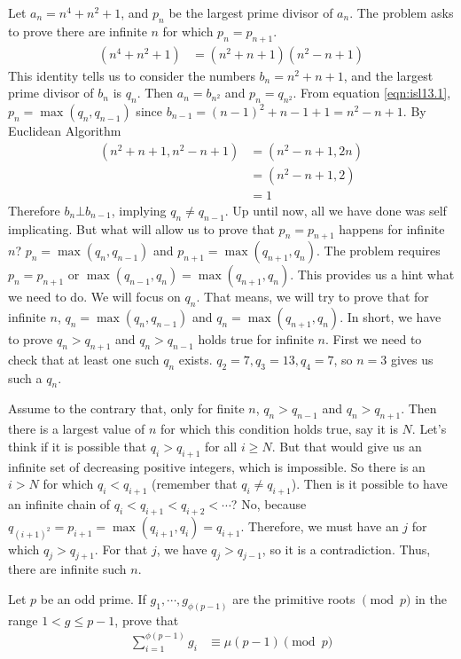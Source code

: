 \documentclass[problems.tex]{subfile}
\begin{document}
	\begin{solution}
		Let $a_n=n^4+n^2+1$, and $p_n$ be the largest prime divisor of $a_n$. The problem asks to prove there are infinite $n$ for which $p_n=p_{n+1}$.
			\begin{align}
				(n^4+n^2+1) & = (n^2+n+1)(n^2-n+1)\label{eqn:isl13.1}
			\end{align}
		This identity tells us to consider the numbers $b_n=n^2+n+1$, and the largest prime divisor of $b_n$ is $q_n$. Then $a_n=b_{n^2}$ and $p_n=q_{n^2}$. From equation \eqref{eqn:isl13.1}, $p_n=\max(q_n,q_{n-1})$ since $b_{n-1}=(n-1)^2+n-1+1=n^2-n+1$. By Euclidean Algorithm
			\begin{align*}
				(n^2+n+1,n^2-n+1) & = (n^2-n+1,2n)\\
								  & = (n^2-n+1,2)\\
								  & = 1
			\end{align*}
		Therefore $b_n\bot b_{n-1}$, implying $q_n\neq q_{n-1}$. Up until now, all we have done was self implicating. But what will allow us to prove that $p_n=p_{n+1}$ happens for infinite $n$? $p_n=\max(q_n,q_{n-1})$ and $p_{n+1}=\max(q_{n+1},q_n)$. The problem requires $p_n=p_{n+1}$ or $\max(q_{n-1},q_n)=\max(q_{n+1},q_n)$. This provides us a hint what we need to do. We will focus on $q_n$. That means, we will try to prove that for infinite $n$, $q_n=\max(q_n,q_{n-1})$ and $q_n=\max(q_{n+1},q_n)$. In short, we have to prove $q_n>q_{n+1}$ and $q_n>q_{n-1}$ holds true for infinite $n$. First we need to check that at least one such $q_n$ exists. $q_2=7,q_3=13,q_4=7$, so $n=3$ gives us such a $q_n$.

		Assume to the contrary that, only for finite $n$, $q_n>q_{n-1}$ and $q_n>q_{n+1}$. Then there is a largest value of $n$ for which this condition holds true, say it is $N$. Let's think if it is possible that $q_i>q_{i+1}$ for all $i\geq N$. But that would give us an infinite set of decreasing positive integers, which is impossible. So there is an $i>N$ for which $q_i<q_{i+1}$ (remember that $q_i\neq q_{i+1}$). Then is it possible to have an infinite chain of $q_i<q_{i+1}<q_{i+2}<\cdots$? No, because $q_{(i+1)^2}=p_{i+1}=\max(q_{i+1},q_i)=q_{i+1}$. Therefore, we must have an $j$ for which $q_j>q_{j+1}$. For that $j$, we have $q_j>q_{j-1}$, so it is a contradiction. Thus, there are infinite such $n$.
	\end{solution}

	\begin{problem}
		Let $p$ be an odd prime. If $g_{1}, \cdots, g_{\phi(p-1)}$ are the primitive roots $\pmod{p}$ in the range $1<g \le p-1$, prove that
			\begin{align*}
				\sum_{i=1}^{\phi(p-1)}g_{i}
					& \equiv \mu(p-1) \pmod{p}
			\end{align*}
	\end{problem}
\end{document}
